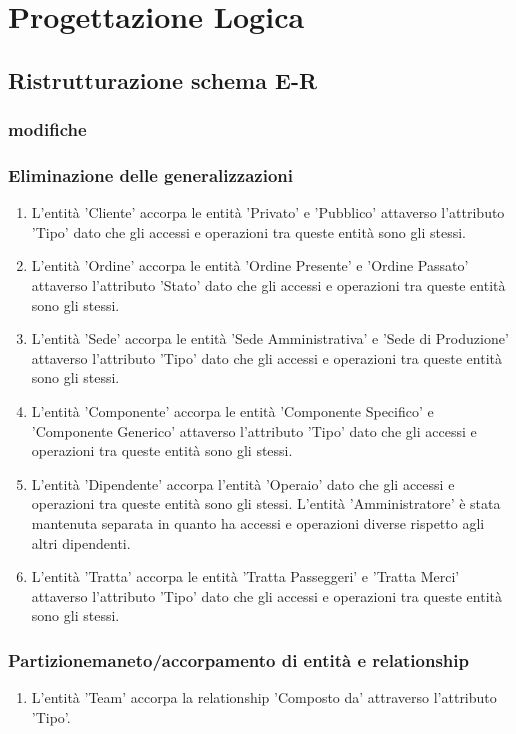 \documentclass{article}
\begin{document}
\section{Progettazione Logica}
\subsection{Ristrutturazione schema E-R}
\subsubsection{modifiche}

\subsubsection{Eliminazione delle generalizzazioni}
\begin{enumerate}
    \item L'entità 'Cliente' accorpa le entità 'Privato' e 'Pubblico' attaverso l'attributo 'Tipo' dato che gli accessi e operazioni tra queste entità sono gli stessi.
    \item L'entità 'Ordine' accorpa le entità 'Ordine Presente' e 'Ordine Passato' attaverso l'attributo 'Stato' dato che gli accessi e operazioni tra queste entità sono gli stessi.
    \item L'entità 'Sede' accorpa le entità 'Sede Amministrativa' e 'Sede di Produzione' attaverso l'attributo 'Tipo' dato che gli accessi e operazioni tra queste entità sono gli stessi.
    \item L'entità 'Componente' accorpa le entità 'Componente Specifico' e 'Componente Generico' attaverso l'attributo 'Tipo' dato che gli accessi e operazioni tra queste entità sono gli stessi.
    \item L'entità 'Dipendente' accorpa l'entità 'Operaio' dato che gli accessi e operazioni tra queste entità sono gli stessi. L'entità 'Amministratore' è stata mantenuta separata in quanto ha accessi e operazioni diverse rispetto agli altri dipendenti.
    \item L'entità 'Tratta' accorpa le entità 'Tratta Passeggeri' e 'Tratta Merci' attaverso l'attributo 'Tipo' dato che gli accessi e operazioni tra queste entità sono gli stessi.
\end{enumerate}

\subsubsection{Partizionemaneto/accorpamento di entità e relationship}
\begin{enumerate}
    \item L'entità 'Team' accorpa la relationship 'Composto da' attraverso l'attributo 'Tipo'.
\end{enumerate}
\end{document}
